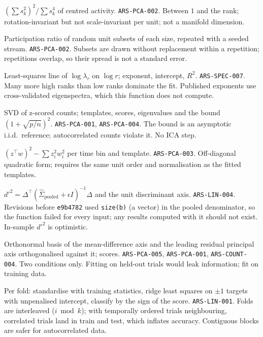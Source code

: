 {$(\sum s_k^2)^2/\sum s_k^4$ of centred activity.}
{\texttt{ARS-PCA-002}.}
{Between $1$ and the rank; rotation-invariant but not scale-invariant per unit; not a manifold dimension.}

{Participation ratio of random unit subsets of each size, repeated with a seeded stream.}
{\texttt{ARS-PCA-002}.}
{Subsets are drawn without replacement within a repetition; repetitions overlap, so their spread is not a standard error.}

{Least-squares line of $\log\lambda_r$ on $\log r$; exponent, intercept, $R^2$.}
{\texttt{ARS-SPEC-007}.}
{Many more high ranks than low ranks dominate the fit. Published exponents use cross-validated eigenspectra, which this function does not compute.}

{SVD of z-scored counts; templates, scores, eigenvalues and the bound $(1+\sqrt{p/n})^2$.}
{\texttt{ARS-PCA-001}, \texttt{ARS-PCA-004}.}
{The bound is an asymptotic i.i.d.\ reference; autocorrelated counts violate it. No ICA step.}

{$(z^\top w)^2-\sum z_i^2w_i^2$ per time bin and template.}
{\texttt{ARS-PCA-003}.}
{Off-diagonal quadratic form; requires the same unit order and normalisation as the fitted templates.}

{$d'^2=\Delta^\top(\hat\Sigma_{\text{pooled}}+\epsilon I)^{-1}\Delta$ and the unit discriminant axis.}
{\texttt{ARS-LIN-004}.}
{Revisions before \texttt{e9b4782} used \texttt{size(b)} (a vector) in the pooled denominator, so the function failed for every input; any results computed with it should not exist. In-sample $d'^2$ is optimistic.}

{Orthonormal basis of the mean-difference axis and the leading residual principal axis orthogonalised against it; scores.}
{\texttt{ARS-PCA-005}, \texttt{ARS-PCA-001}, \texttt{ARS-COUNT-004}.}
{Two conditions only. Fitting on held-out trials would leak information; fit on training data.}

{Per fold: standardise with training statistics, ridge least squares on $\pm1$ targets with unpenalised intercept, classify by the sign of the score.}
{\texttt{ARS-LIN-001}.}
{Folds are interleaved ($i\bmod k$); with temporally ordered trials neighbouring, correlated trials land in train and test, which inflates accuracy. Contiguous blocks are safer for autocorrelated data.}

